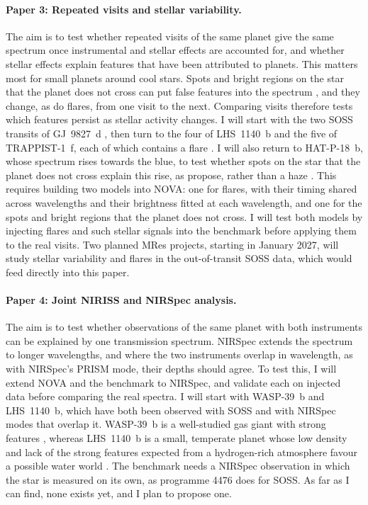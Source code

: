 \paragraph{Paper 3: Repeated visits and stellar variability.} The aim is to
test whether repeated visits of the same planet give the same spectrum once instrumental and stellar effects are accounted for, and whether stellar effects explain features that have been attributed to planets. This matters most for
small planets around cool stars. Spots and bright regions on the star that the
planet does not cross can put false features into the spectrum
\citep{RackhamEtAl2018}, and they change, as do flares, from one visit to the
next. Comparing visits therefore tests which features persist as stellar activity changes. I will start with the two SOSS transits of GJ~9827~d
\citep{PiauletGhorayebEtAl2024}, then turn to the four of LHS~1140~b
\citep{CadieuxEtAl2024,GressierEtAl2026} and the five of TRAPPIST-1~f, each of
which contains a flare \citep{LimEtAl2026}. I will also return to HAT-P-18~b, whose spectrum rises towards the blue, to test whether spots on the star that the planet does not cross explain this rise, as \citet{FournierTondreauEtAl2024} propose, rather than a haze \citep{FuEtAl2022}. This requires building two models
into NOVA: one for flares, with their timing shared across wavelengths and
their brightness fitted at each wavelength, and one for the spots and bright
regions that the planet does not cross. I will test both models by injecting
flares and such stellar signals into the benchmark before applying them to the
real visits. Two planned MRes projects, starting in January 2027, will study
stellar variability and flares in the out-of-transit SOSS data, which would
feed directly into this paper.

\paragraph{Paper 4: Joint NIRISS and NIRSpec analysis.} The aim is to test
whether observations of the same planet with both instruments can be explained
by one transmission spectrum. NIRSpec extends the spectrum to longer
wavelengths, and where the two instruments overlap in wavelength, as with
NIRSpec's PRISM mode, their depths should agree. To test this, I will extend
NOVA and the benchmark to NIRSpec, and validate each on injected data before
comparing the real spectra. I will start with WASP-39~b and LHS~1140~b, which
have both been observed with SOSS and with NIRSpec modes that overlap it.
WASP-39~b is a well-studied gas giant with strong features \citep{CarterEtAl2024}, whereas LHS~1140~b is a small, temperate planet whose low density and lack of the strong features expected from a hydrogen-rich atmosphere favour a possible water world \citep{DamianoEtAl2024}. The benchmark needs a NIRSpec observation in which the
star is measured on its own, as programme 4476 does for SOSS. As far as I can
find, none exists yet, and I plan to propose one.

